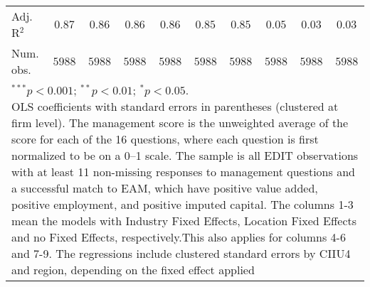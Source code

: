 \documentclass{article}
\begin{document}
\begin{table}
\begin{center}
\begin{small}
\begin{tabular}{l c c c c c c c c c}
Adj. R$^2$     & $0.87$       & $0.86$       & $0.86$       & $0.86$       & $0.85$       & $0.85$       & $0.05$       & $0.03$       & $0.03$       \\
Num. obs.      & $5988$       & $5988$       & $5988$       & $5988$       & $5988$       & $5988$       & $5988$       & $5988$       & $5988$       \\
\hline
\multicolumn{10}{l}{\tiny{\parbox{0.95\linewidth}{\vspace{3pt}$^{***}p<0.001$; $^{**}p<0.01$; $^{*}p<0.05$. \\OLS coefficients with standard errors in parentheses (clustered at firm level). The management score is the unweighted average of the score for each of the 16 questions, where each question is first normalized to be on a 0–1 scale. The sample is all EDIT observations with at least 11 non-missing responses to management questions and a successful match to EAM, which have positive value added, positive employment, and positive imputed capital. The columns 1-3 mean the models with Industry Fixed Effects, Location Fixed Effects and no Fixed Effects, respectively.This also applies for columns 4-6 and 7-9. The regressions include clustered standard errors by CIIU4 and region, depending on the fixed effect applied}}}
\end{tabular}
\end{small}
\label{table:coefficients}
\end{center}
\end{table}
\end{document}
